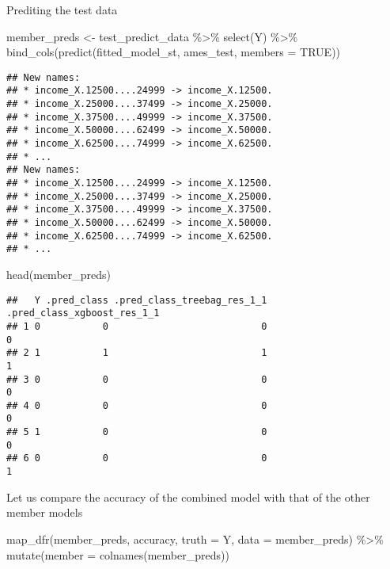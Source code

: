 \documentclass[
]{article}
\newenvironment{Shaded}{\begin{snugshade}}{\end{snugshade}}
\newcommand{\AttributeTok}[1]{\textcolor[rgb]{0.77,0.63,0.00}{#1}}
\newcommand{\ConstantTok}[1]{\textcolor[rgb]{0.00,0.00,0.00}{#1}}
\newcommand{\FunctionTok}[1]{\textcolor[rgb]{0.00,0.00,0.00}{#1}}
\newcommand{\NormalTok}[1]{#1}
\newcommand{\OtherTok}[1]{\textcolor[rgb]{0.56,0.35,0.01}{#1}}
\newcommand{\SpecialCharTok}[1]{\textcolor[rgb]{0.00,0.00,0.00}{#1}}
\begin{document}
Prediting the test data

\begin{Shaded}
\begin{Highlighting}[]
\NormalTok{member\_preds }\OtherTok{\textless{}{-}} 
\NormalTok{  test\_predict\_data }\SpecialCharTok{\%\textgreater{}\%}
  \FunctionTok{select}\NormalTok{(Y) }\SpecialCharTok{\%\textgreater{}\%}
  \FunctionTok{bind\_cols}\NormalTok{(}\FunctionTok{predict}\NormalTok{(fitted\_model\_st, ames\_test, }\AttributeTok{members =} \ConstantTok{TRUE}\NormalTok{))}
\end{Highlighting}
\end{Shaded}

\begin{verbatim}
## New names:
## * income_X.12500....24999 -> income_X.12500.
## * income_X.25000....37499 -> income_X.25000.
## * income_X.37500....49999 -> income_X.37500.
## * income_X.50000....62499 -> income_X.50000.
## * income_X.62500....74999 -> income_X.62500.
## * ...
## New names:
## * income_X.12500....24999 -> income_X.12500.
## * income_X.25000....37499 -> income_X.25000.
## * income_X.37500....49999 -> income_X.37500.
## * income_X.50000....62499 -> income_X.50000.
## * income_X.62500....74999 -> income_X.62500.
## * ...
\end{verbatim}

\begin{Shaded}
\begin{Highlighting}[]
\FunctionTok{head}\NormalTok{(member\_preds)}
\end{Highlighting}
\end{Shaded}

\begin{verbatim}
##   Y .pred_class .pred_class_treebag_res_1_1 .pred_class_xgboost_res_1_1
## 1 0           0                           0                           0
## 2 1           1                           1                           1
## 3 0           0                           0                           0
## 4 0           0                           0                           0
## 5 1           0                           0                           0
## 6 0           0                           0                           1
\end{verbatim}

Let us compare the accuracy of the combined model with that of the other
member models

\begin{Shaded}
\begin{Highlighting}[]
\FunctionTok{map\_dfr}\NormalTok{(member\_preds, accuracy, }\AttributeTok{truth =}\NormalTok{ Y, }\AttributeTok{data =}\NormalTok{ member\_preds) }\SpecialCharTok{\%\textgreater{}\%}
  \FunctionTok{mutate}\NormalTok{(}\AttributeTok{member =} \FunctionTok{colnames}\NormalTok{(member\_preds))}
\end{Highlighting}
\end{Shaded}
\end{document}
